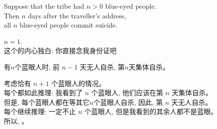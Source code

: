 \begin{frame}{}
  \begin{center}

    \pause
    \vspace{0.80cm}
    \begin{theorem}
      \begin{center}
        Suppose that the tribe had $n > 0$ blue-eyed people. \\[6pt]
        Then $n$ days after the traveller's address, \\[6pt]
        all $n$ blue-eyed people commit suicide.
      \end{center}
    \end{theorem}
  \end{center}
\end{frame}

\begin{frame}{}
  \begin{center}

    \pause
    \vspace{0.30cm}
    \begin{description}
      \setlength{\itemsep}{8pt}
      \item[基础步骤:] $n = 1$. \\ \pause
        这个的内心独白: 你直接念我身份证吧 \pause
      \item[归纳假设:] 有$n$个蓝眼人时, 前 $n-1$ 天无人自杀, 第$n$天集体自杀。\pause
      \item[归纳步骤:] 考虑恰有 $n+1$ 个蓝眼人的情况。 \\[6pt] \pause
        每个都如此推理: 我看到了 $n$ 个蓝眼人, 他们应该在第 $n$ 天集体自杀。
        \\[6pt] \pause
        但是, 每个蓝眼人都在等其它$n$个蓝眼人自杀, 因此, 第 $n$ 天无人自杀。
        \\[6pt] \pause
        每个继续推理: 一定不止 $n$ 个蓝眼人, 但是我看到的其余人都不是蓝眼。
        \\[6pt] \pause
        所以, 。
    \end{description}
  \end{center}
\end{frame}

